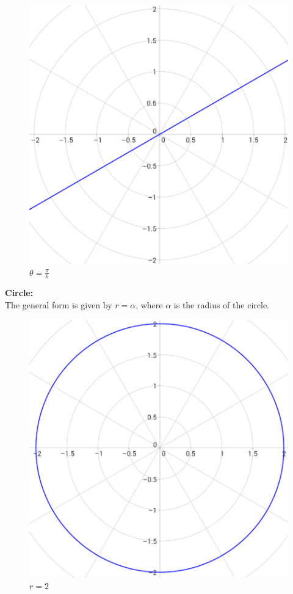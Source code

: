 \documentclass{article}
\begin{document}
            \begin{figure} [hbt!]
                \centering
                \includegraphics[scale=0.4]{Resources/Unit3Vectors/line.PNG}
                \caption*{$\theta=\frac{\pi}{6}$}
            \end{figure}

            \noindent \textbf{Circle:} \\
            The general form is given by $r=\alpha$, where $\alpha$ is the radius of the circle. \\

            \begin{figure} [hbt!]
                \centering
                \includegraphics[scale=0.4]{Resources/Unit3Vectors/circle.PNG}
                \caption*{$r=2$}
            \end{figure}
\end{document}
